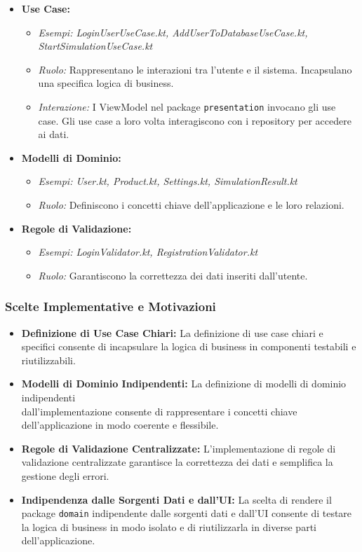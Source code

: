 \begin{itemize}
    \item \textbf{Use Case:}
    \begin{itemize}
        \item \textit{Esempi: LoginUserUseCase.kt, AddUserToDatabaseUseCase.kt,
        StartSimulationUseCase.kt}
        \item \textit{Ruolo:} Rappresentano le interazioni tra l'utente e il
        sistema.
        Incapsulano una specifica logica di business.
        \item \textit{Interazione:} I ViewModel nel package
        \texttt{presentation} invocano gli use case.
        Gli use case a loro volta
        interagiscono con i repository per accedere ai dati.
    \end{itemize}
    \item \textbf{Modelli di Dominio:}
    \begin{itemize}
        \item \textit{Esempi: User.kt, Product.kt, Settings.kt,
        SimulationResult.kt}
        \item \textit{Ruolo:} Definiscono i concetti chiave dell'applicazione e
        le loro relazioni.
    \end{itemize}
    \item \textbf{Regole di Validazione:}
    \begin{itemize}
        \item \textit{Esempi: LoginValidator.kt, RegistrationValidator.kt}
        \item \textit{Ruolo:} Garantiscono la correttezza dei dati inseriti
        dall'utente.
    \end{itemize}
\end{itemize}

\subsubsection{Scelte Implementative e Motivazioni}

\begin{itemize}
    \item \textbf{Definizione di Use Case Chiari:} La definizione di use case
    chiari e specifici consente di incapsulare la logica di business in
    componenti testabili e riutilizzabili.
    \item \textbf{Modelli di Dominio Indipendenti:} La definizione di modelli di
    dominio indipendenti \\ dall'implementazione consente di rappresentare i
    concetti chiave dell'applicazione in modo coerente e flessibile.
    \item \textbf{Regole di Validazione Centralizzate:} L'implementazione di
    regole di validazione centralizzate garantisce la correttezza dei dati e
    semplifica la gestione degli errori.
    \item \textbf{Indipendenza dalle Sorgenti Dati e dall'UI:} La scelta di
    rendere il package \texttt{domain} indipendente dalle sorgenti dati e
    dall'UI consente di testare la logica di business in modo isolato e di
    riutilizzarla in diverse parti dell'applicazione.
\end{itemize}

